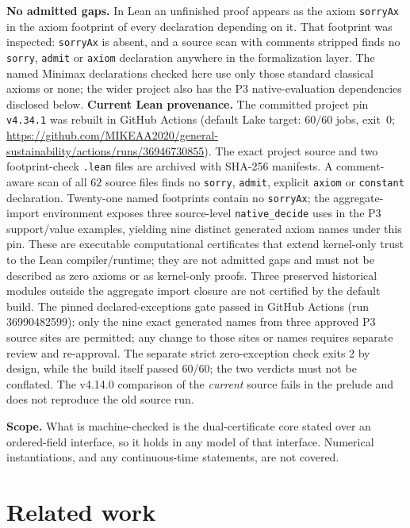 \documentclass[10pt,twocolumn]{article}
\theoremstyle{definition}
\begin{document}
\noindent\textbf{No admitted gaps.} In Lean an unfinished proof appears as the axiom
\texttt{sorryAx} in the axiom footprint of every declaration depending on it. That
footprint was inspected: \texttt{sorryAx} is absent, and a source scan with comments
stripped finds no \texttt{sorry}, \texttt{admit} or \texttt{axiom} declaration anywhere in
the formalization layer. The named Minimax declarations checked here use only those standard classical axioms or none; the wider project also has the P3 native-evaluation dependencies disclosed below.
\noindent\textbf{Current Lean provenance.} The committed project pin \texttt{v4.34.1} was rebuilt in GitHub Actions (default Lake target: \(60/60\) jobs, exit~0; \url{https://github.com/MIKEAA2020/general-sustainability/actions/runs/36946730855}). The exact project source and two footprint-check \texttt{.lean} files are archived with SHA-256 manifests. A comment-aware scan of all \(62\) source files finds no \texttt{sorry}, \texttt{admit}, explicit \texttt{axiom} or \texttt{constant} declaration. Twenty-one named footprints contain no \texttt{sorryAx}; the aggregate-import environment exposes three source-level \texttt{native\_decide} uses in the P3 support/value examples, yielding nine distinct generated axiom names under this pin. These are executable computational certificates that extend kernel-only trust to the Lean compiler/runtime; they are not admitted gaps and must not be described as zero axioms or as kernel-only proofs. Three preserved historical modules outside the aggregate import closure are not certified by the default build. The pinned declared-exceptions gate passed in GitHub Actions (run 36990482599): only the nine exact generated names from three approved P3 source sites are permitted; any change to those sites or names requires separate review and re-approval. The separate strict zero-exception check exits 2 by design, while the build itself passed 60/60; the two verdicts must not be conflated. The v4.14.0 comparison of the \emph{current} source fails in the prelude and does not reproduce the old source run.


\noindent\textbf{Scope.} What is machine-checked is the dual-certificate core stated over
an ordered-field interface, so it holds in any model of that interface. Numerical
instantiations, and any continuous-time statements, are not covered.

\section{Related work}
\label{priorart}
\end{document}
